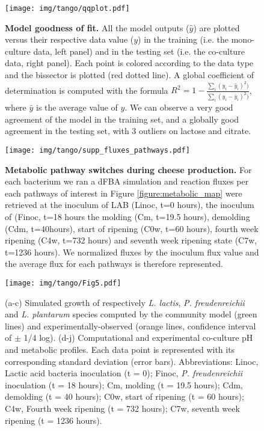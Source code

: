 \documentclass[../main.tex]{subfiles}
\begin{document}
\begin{figure}[htpb!]
    \centering
    \texttt{[image: img/tango/qqplot.pdf]}
    \caption{\textbf{Model goodness of fit.} All the model outputs ($\hat{y}$) are plotted versus their respective data value ($y$) in the training (i.e. the mono-culture data, left panel) and in the testing set (i.e. the co-culture data, right panel). Each point is colored according to the data type and the bissector is plotted (red dotted line). A global coefficient of determination is computed with the formula $R^2 = 1 - \frac{\sum_i (y_i - \hat{y}_i)^2)}{\sum_i (y_i - \bar{y}_i)^2)}$, where $\bar{y}$ is the average value of $y$. We can observe a very good agreement of the model in the training set, and a globally good agreement in the testing set, with 3 outliers on lactose and citrate.}
    \label{fig:qqplot}
\end{figure}


\begin{figure}[htpb!]
    \centering
    \texttt{[image: img/tango/supp\_fluxes\_pathways.pdf]}
    \caption{\textbf{Metabolic pathway switches during cheese production.} For each bacterium we ran a dFBA simulation and reaction fluxes per each pathways of interest in Figure \ref{figure:metabolic_map} were retrieved at the inoculum of LAB (Linoc, t=0 hours), the inoculum of \freud (Finoc, t=18 hours the molding (Cm, t=19.5 hours), demolding (Cdm, t=40hours), start of ripening (C0w, t=60 hours), fourth week ripening (C4w, t=732 hours) and seventh week ripening state (C7w, t=1236 hours). We normalized fluxes by the inoculum flux value and the average flux for each pathways is therefore represented.}
    \label{fig:switch_metabolic_pathway}
\end{figure}

\begin{figure}[htpb!]
    \centering
    \texttt{[image: img/tango/Fig5.pdf]}
    \caption{(a-c) Simulated growth of respectively \textit{L. lactis}, \textit{P. freudenreichii} and \textit{L. plantarum} species computed by the community model (green lines) and experimentally-observed (orange lines, confidence interval of $\pm$ 1/4 log). (d-j) Computational and experimental co-culture pH and metabolic profiles. Each data point is represented with its corresponding standard deviation (error bars). Abbreviations: Linoc, Lactic acid bacteria inoculation (t = 0); Finoc, \textit{P. freudenreichii} inoculation (t = 18 hours); Cm, molding (t = 19.5 hours); Cdm, demolding (t = 40 hours); C0w, start of ripening (t = 60 hours); C4w, Fourth week ripening (t = 732 hours); C7w, seventh week ripening (t = 1236 hours).}
    \label{dfba_community}
\end{figure}
\end{document}
